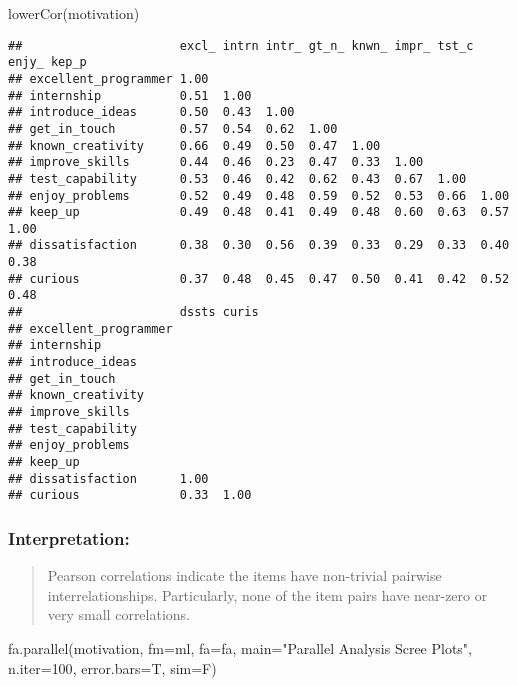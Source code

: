 \documentclass[
]{article}
\newenvironment{Shaded}{\begin{snugshade}}{\end{snugshade}}
\newcommand{\AttributeTok}[1]{\textcolor[rgb]{0.77,0.63,0.00}{#1}}
\newcommand{\DecValTok}[1]{\textcolor[rgb]{0.00,0.00,0.81}{#1}}
\newcommand{\FunctionTok}[1]{\textcolor[rgb]{0.00,0.00,0.00}{#1}}
\newcommand{\NormalTok}[1]{#1}
\newcommand{\StringTok}[1]{\textcolor[rgb]{0.31,0.60,0.02}{#1}}
\begin{document}
\begin{Shaded}
\begin{Highlighting}[]
\FunctionTok{lowerCor}\NormalTok{(motivation)}
\end{Highlighting}
\end{Shaded}

\begin{verbatim}
##                      excl_ intrn intr_ gt_n_ knwn_ impr_ tst_c enjy_ kep_p
## excellent_programmer 1.00                                                 
## internship           0.51  1.00                                           
## introduce_ideas      0.50  0.43  1.00                                     
## get_in_touch         0.57  0.54  0.62  1.00                               
## known_creativity     0.66  0.49  0.50  0.47  1.00                         
## improve_skills       0.44  0.46  0.23  0.47  0.33  1.00                   
## test_capability      0.53  0.46  0.42  0.62  0.43  0.67  1.00             
## enjoy_problems       0.52  0.49  0.48  0.59  0.52  0.53  0.66  1.00       
## keep_up              0.49  0.48  0.41  0.49  0.48  0.60  0.63  0.57  1.00 
## dissatisfaction      0.38  0.30  0.56  0.39  0.33  0.29  0.33  0.40  0.38 
## curious              0.37  0.48  0.45  0.47  0.50  0.41  0.42  0.52  0.48 
##                      dssts curis
## excellent_programmer            
## internship                      
## introduce_ideas                 
## get_in_touch                    
## known_creativity                
## improve_skills                  
## test_capability                 
## enjoy_problems                  
## keep_up                         
## dissatisfaction      1.00       
## curious              0.33  1.00
\end{verbatim}

\hypertarget{interpretation-8}{%
\subsubsection{Interpretation:}\label{interpretation-8}}

\begin{quote}
Pearson correlations indicate the items have non-trivial pairwise
interrelationships. Particularly, none of the item pairs have near-zero
or very small correlations.
\end{quote}

\begin{Shaded}
\begin{Highlighting}[]
\FunctionTok{fa.parallel}\NormalTok{(motivation, }\AttributeTok{fm=}\StringTok{\textquotesingle{}ml\textquotesingle{}}\NormalTok{, }\AttributeTok{fa=}\StringTok{\textquotesingle{}fa\textquotesingle{}}\NormalTok{, }\AttributeTok{main=}\StringTok{"Parallel Analysis Scree Plots"}\NormalTok{, }\AttributeTok{n.iter=}\DecValTok{100}\NormalTok{, }\AttributeTok{error.bars=}\NormalTok{T, }\AttributeTok{sim=}\NormalTok{F)}
\end{Highlighting}
\end{Shaded}
\end{document}
